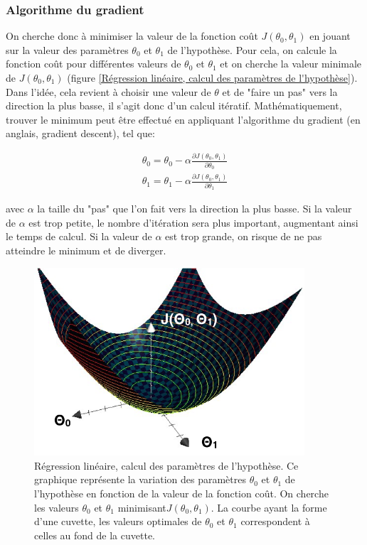 \subsubsection{Algorithme du gradient}
On cherche donc à minimiser la valeur de la fonction coût $J(\theta_0,\theta_1)$ en jouant sur la valeur des paramètres $\theta_0$ et $\theta_1$ de l'hypothèse. Pour cela, on calcule la fonction coût pour différentes valeurs de $\theta_0$ et $\theta_1$ et on cherche la valeur minimale de $J(\theta_0,\theta_1)$ (figure \ref{Régression linéaire, calcul des paramètres de l'hypothèse}). Dans l'idée, cela revient à choisir une valeur de $\theta$ et de "faire un pas" vers la direction la plus basse, il s'agit donc d'un calcul itératif. Mathématiquement, trouver le minimum peut être effectué en appliquant l'algorithme du gradient (en anglais, gradient descent), tel que:

\begin{equation}
	\begin{split}
		\theta_0 = \theta_0 - \alpha \frac{\partial J(\theta_0,\theta_1)}{\partial\theta_0} \\
		\theta_1 = \theta_1 - \alpha \frac{\partial J(\theta_0,\theta_1)}{\partial\theta_1}
	\end{split}
\end{equation}

avec $\alpha$ la taille du "pas" que l'on fait vers la direction la plus basse. Si la valeur de $\alpha$ est trop petite, le nombre d'itération sera plus important, augmentant ainsi le temps de calcul. Si la valeur de $\alpha$ est trop grande, on risque de ne pas atteindre le minimum et de diverger.  

\begin{figure}[h]
	\centering\includegraphics[height=7cm]{images/gradient.png}
	\caption[Régression linéaire, calcul des paramètres de l'hypothèse]{Régression linéaire, calcul des paramètres de l'hypothèse. Ce graphique représente la variation des paramètres $\theta_0$ et $\theta_1$ de l'hypothèse en fonction de la valeur de la fonction coût. On cherche les valeurs  $\theta_0$ et $\theta_1$ minimisant$J(\theta_0,\theta_1)$. La courbe ayant la forme d'une cuvette, les valeurs optimales de $\theta_0$ et $\theta_1$ correspondent à celles au fond de la cuvette.}
	\label{fig:Régression linéaire, calcul des paramètres de l'hypothèse}
\end{figure}
 
